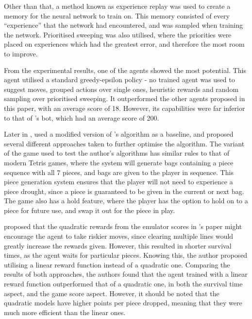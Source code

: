 \documentclass[a4paper, 12pt]{extreport}
\begin{document}
				Other than that, a method known as experience replay was used to create a memory for the neural network to train on. This memory consisted of every ``experience'' that the network had encountered, and was sampled when training the network. Prioritised sweeping was also utilised, where the priorities were placed on experiences which had the greatest error, and therefore the most room to improve.
				
				From the experimental results, one of the agents showed the most potential. This agent utilised a standard greedy-epsilon policy - no trained agent was used to suggest moves, grouped actions over single ones, heuristic rewards and random sampling over prioritised sweeping. It outperformed the other agents proposed in this paper, with an average score of 18. However, its capabilities were far inferior to that of \citeauthor{lee-ai}'s bot, which had an average score of 200.
				
				Later in \citeyear{tetris-drl-2}, \citeauthor{tetris-drl-2} \cite{tetris-drl-2} used a modified version of \citeauthor{tetris-drl}'s algorithm as a baseline, and proposed several different approaches taken to further optimise the algorithm. The variant of the game used to test the author's algorithms has similar rules to that of modern Tetris games, where the system will generate bags containing a piece sequence with all 7 pieces, and bags are given to the player in sequence. This piece generation system ensures that the player will not need to experience a piece drought, since a piece is guaranteed to be given in the current or next bag. The game also has a hold feature, where the player has the option to hold on to a piece for future use, and swap it out for the piece in play.
				
				\citeauthor{tetris-drl-2} proposed that the quadratic rewards from the emulator scores in \citeauthor{tetris-drl}'s paper might encourage the agent to take riskier moves, since clearing multiple lines would greatly increase the rewards given. However, this resulted in shorter survival times, as the agent waits for particular pieces. Knowing this, the author proposed utilising a linear reward function instead of a quadratic one. Comparing the results of both approaches, the authors found that the agent trained with a linear reward function outperformed that of a quadratic one, in both the survival time aspect, and the game score aspect. However, it should be noted that the quadratic models have higher points per piece dropped, meaning that they were much more efficient than the linear ones.
				
\end{document}
